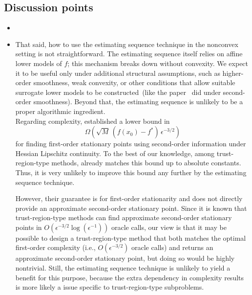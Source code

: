 \subsection{Discussion points}\label{sec.discussion-points}

\begin{itemize}
    \item {}

    \item[]{\color{blue} That said, how to use the estimating sequence technique in the nonconvex setting is not straightforward. The estimating sequence itself relies on affine lower models of $f$; this mechanism breaks down without convexity. We expect it to be useful only under additional structural assumptions, such as higher-order smoothness, weak convexity, or other conditions that allow suitable surrogate lower models to be constructed~(like the paper~\citet{carmon2017convex} did under second-order smoothness). Beyond that, the estimating sequence is unlikely to be a proper algorithmic ingredient. \\
          Regarding complexity, \citet{carmon2020lower} established a lower bound in
          \[
              \Omega\!\left(\sqrt{M}\,(f(x_0)-f^*)\,\epsilon^{-3/2}\right)
          \]
          for finding first-order stationary points using second-order information under Hessian Lipschitz continuity. To the best of our knowledge, among trust-region-type methods, \citet{hamad2022consistently} already matches this bound up to absolute constants. Thus, it is very unlikely to improve this bound any further by the estimating sequence technique.

          However, their guarantee is for first-order stationarity and does not directly provide an approximate second-order stationary point. Since it is known that trust-region-type methods can find approximate second-order stationary points
          \citep{jiang2026beyond,curtis2017trust,curtis2021trust} in $O(\epsilon^{-3/2}\log(\epsilon^{-1}))$ oracle calls, our view is that it may be possible to design a trust-region-type method that both matches the optimal first-order complexity (i.e., $O(\epsilon^{-3/2})$ oracle calls) and returns an approximate second-order stationary point, but doing so would be highly nontrivial. Still, the estimating sequence technique is unlikely to yield a benefit for this purpose, because the extra dependency in complexity results is more likely a issue specific to trust-region-type subproblems.}


\end{itemize}
